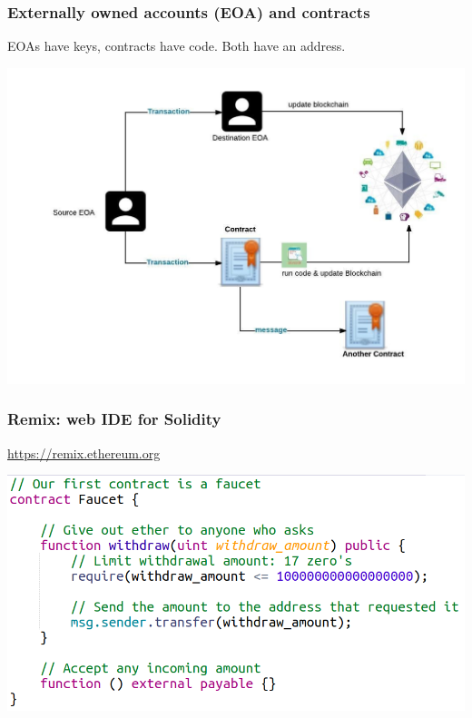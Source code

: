 \documentclass[11pt]{beamer}  %
\begin{document}
\begin{frame}\frametitle{Externally owned accounts (EOA) and contracts}

  \begin{greenbox}{}
    EOAs have keys, contracts have code. Both have an address.
  \end{greenbox}
  
  \begin{center}
    \includegraphics[scale=0.35,clip=false]{pictures/eoa-contract.jpg}
  \end{center}

\end{frame}

\begin{frame}\frametitle{Remix: web IDE for Solidity}

  \begin{greenbox}{}
    \url{https://remix.ethereum.org}
  \end{greenbox}

  \begin{center}
    \includegraphics[width=\textwidth,clip=false]{pictures/faucet_sol.png}
  \end{center}

\end{frame}
\end{document}
